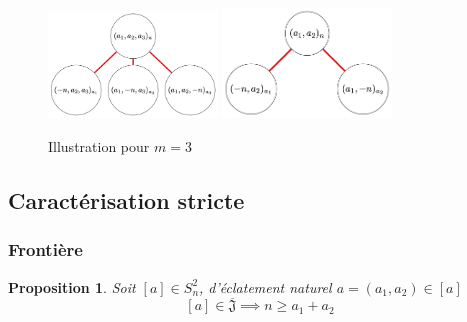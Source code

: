 \documentclass{article}
\newtheorem{proposition}{Proposition}
\newcommand{\J}{\mathfrak{J}}
\newcommand{\JS}{\overline{\J}}
\begin{document}
\begin{figure}[h]
    \caption{Illustration pour $m = 3$}
    \centering
    \includegraphics[width=0.4\textwidth]{abcn}
    \includegraphics[width=0.4\textwidth]{abn}
\end{figure}

\newpage

\subsection{Caractérisation stricte}

\subsubsection{Frontière}

\begin{proposition}
    Soit $[a] \in S_n^2$, d'éclatement naturel $a = (a_1, a_2) \in [a]$
    \[ [a] \in \JS \implies n \geq a_1 + a_2 \]
\end{proposition} 
\end{document}

